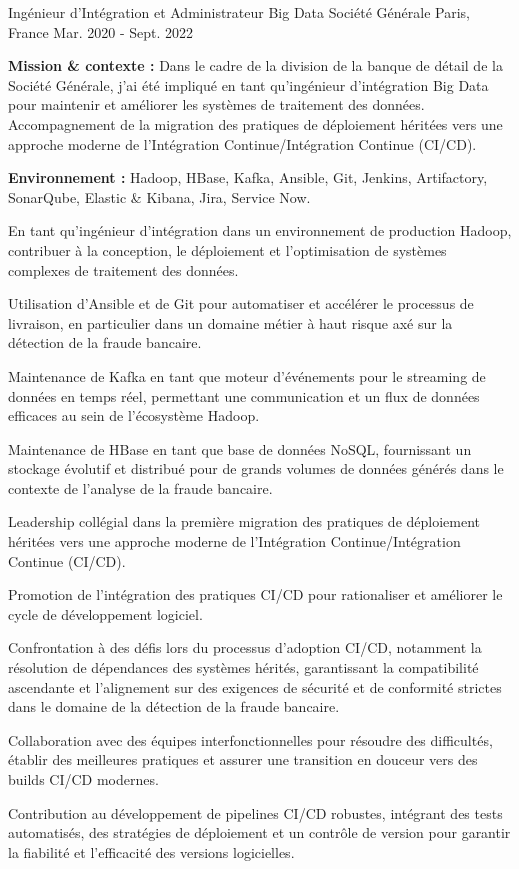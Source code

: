 \begin{cventries}
{\begin{cvitems}
{%
\cventry
{Ingénieur d'Intégration et Administrateur Big Data} %
{Société Générale} %
{Paris, France} %
{Mar. 2020 - Sept. 2022} %
{
  \begin{cvitems} %
    \item {\textbf{Mission \& contexte :} Dans le cadre de la division de la banque de détail de la Société Générale, j'ai été impliqué en tant qu'ingénieur d'intégration Big Data pour maintenir et améliorer les systèmes de traitement des données. Accompagnement de la migration des pratiques de déploiement héritées vers une approche moderne de l'Intégration Continue/Intégration Continue (CI/CD).}
    \item {\textbf{Environnement :} Hadoop, HBase, Kafka, Ansible, Git, Jenkins, Artifactory, SonarQube, Elastic \& Kibana, Jira, Service Now.}
    \item {En tant qu'ingénieur d'intégration dans un environnement de production Hadoop, contribuer à la conception, le déploiement et l'optimisation de systèmes complexes de traitement des données.}
    \item {Utilisation d'Ansible et de Git pour automatiser et accélérer le processus de livraison, en particulier dans un domaine métier à haut risque axé sur la détection de la fraude bancaire.}
    \item {Maintenance de Kafka en tant que moteur d'événements pour le streaming de données en temps réel, permettant une communication et un flux de données efficaces au sein de l'écosystème Hadoop.}
    \item {Maintenance de HBase en tant que base de données NoSQL, fournissant un stockage évolutif et distribué pour de grands volumes de données générés dans le contexte de l'analyse de la fraude bancaire.}
    \item {Leadership collégial dans la première migration des pratiques de déploiement héritées vers une approche moderne de l'Intégration Continue/Intégration Continue (CI/CD).}
    \item {Promotion de l'intégration des pratiques CI/CD pour rationaliser et améliorer le cycle de développement logiciel.}
    \item {Confrontation à des défis lors du processus d'adoption CI/CD, notamment la résolution de dépendances des systèmes hérités, garantissant la compatibilité ascendante et l'alignement sur des exigences de sécurité et de conformité strictes dans le domaine de la détection de la fraude bancaire.}
    \item {Collaboration avec des équipes interfonctionnelles pour résoudre des difficultés, établir des meilleures pratiques et assurer une transition en douceur vers des builds CI/CD modernes.}
    \item {Contribution au développement de pipelines CI/CD robustes, intégrant des tests automatisés, des stratégies de déploiement et un contrôle de version pour garantir la fiabilité et l'efficacité des versions logicielles.}
  \end{cvitems}  
}


}
\end{cvitems}}
\end{cventries}
